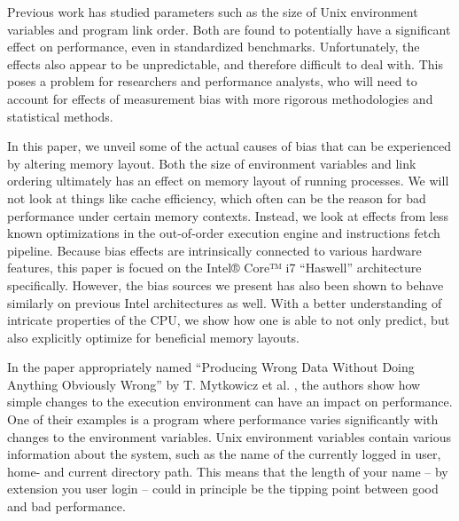 \documentclass[a4paper,11pt,twocolumn,twoside]{article}
\begin{document}
Previous work has studied parameters such as the size of Unix environment variables and program link order. 
Both are found to potentially have a significant effect on performance, even in standardized benchmarks. 
Unfortunately, the effects also appear to be unpredictable, and therefore difficult to deal with. 
This poses a problem for researchers and performance analysts, who will need to account for effects of measurement bias with more rigorous methodologies and statistical methods.



In this paper, we unveil some of the actual causes of bias that can be experienced by altering memory layout.
Both the size of environment variables and link ordering ultimately has an effect on memory layout of running processes. 
We will not look at things like cache efficiency, which often can be the reason for bad performance under certain memory contexts. 
Instead, we look at effects from less known optimizations in the out-of-order execution engine and instructions fetch pipeline. 
Because bias effects are intrinsically connected to various hardware features, this paper is focued on the Intel® Core™ i7 “Haswell” architecture specifically. 
However, the bias sources we present has also been shown to behave similarly on previous Intel architectures as well.
With a better understanding of intricate properties of the CPU, we show how one is able to not only predict, but also explicitly optimize for beneficial memory layouts. 

In the paper appropriately named “Producing Wrong Data Without Doing Anything Obviously Wrong” by T. Mytkowicz et al. \cite{Mytkowicz:2009:WrongData}, the authors show how simple changes to the execution environment can have an impact on performance. 
One of their examples is a program where performance varies significantly with changes to the environment variables. 
Unix environment variables contain various information about the system, such as the name of the currently logged in user, home- and current directory path.
This means that the length of your name -- by extension you user login -- could in principle be the tipping point between good and bad performance.
\end{document}
